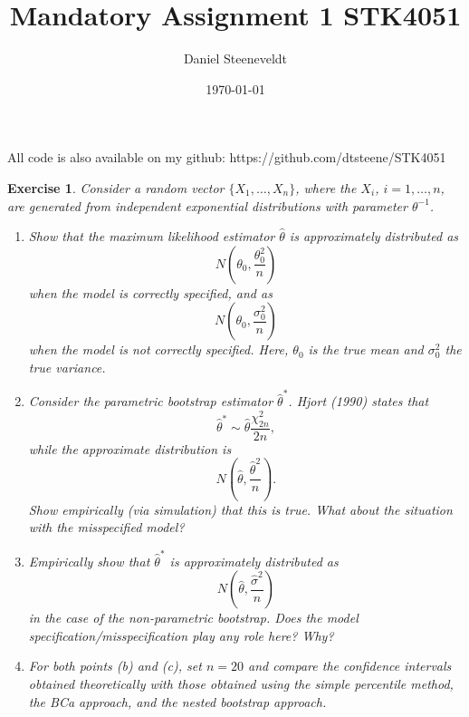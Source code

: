 \documentclass[a4paper,12pt]{article}
\title{Mandatory Assignment 1 STK4051}
\author{Daniel Steeneveldt}
\date{\today}
\theoremstyle{breaktheorem}
\theoremstyle{exerciseStyle}
\newtheorem{exercise}{Exercise}[section]
\theoremstyle{solutionStyle}
\begin{document}
\maketitle

All code is also available on my github:
https://github.com/dtsteene/STK4051
\begin{exercise}{1}
    Consider a random vector $\{X_1, \ldots, X_n\}$, where the $X_i$, $i=1, \ldots, n$, are generated from independent exponential distributions with parameter $\theta^{-1}$.

    \begin{enumerate}
        \item[(a)] Show that the maximum likelihood estimator $\hat{\theta}$ is approximately distributed as
              \[
                  N\left(\theta_0, \frac{\theta_0^2}{n}\right)
              \]
              when the model is correctly specified, and as
              \[
                  N\left(\theta_0, \frac{\sigma_0^2}{n}\right)
              \]
              when the model is not correctly specified. Here, $\theta_0$ is the true mean and $\sigma_0^2$ the true variance.

        \item[(b)] Consider the parametric bootstrap estimator $\hat{\theta}^*$. Hjort (1990) states that
              \[
                  \hat{\theta}^* \sim \hat{\theta}\frac{\chi^2_{2n}}{2n},
              \]
              while the approximate distribution is
              \[
                  N\left(\hat{\theta}, \frac{\hat{\theta}^2}{n}\right).
              \]
              Show empirically (via simulation) that this is true. What about the situation with the misspecified model?

        \item[(c)] Empirically show that $\hat{\theta}^*$ is approximately distributed as
              \[
                  N\left(\hat{\theta}, \frac{\hat{\sigma}^2}{n}\right)
              \]
              in the case of the non-parametric bootstrap. Does the model specification/misspecification play any role here? Why?

        \item[(d)] For both points (b) and (c), set $n = 20$ and compare the confidence intervals obtained theoretically with those obtained using the simple percentile method, the BCa approach, and the nested bootstrap approach.
    \end{enumerate}
\end{exercise}
\end{document}
